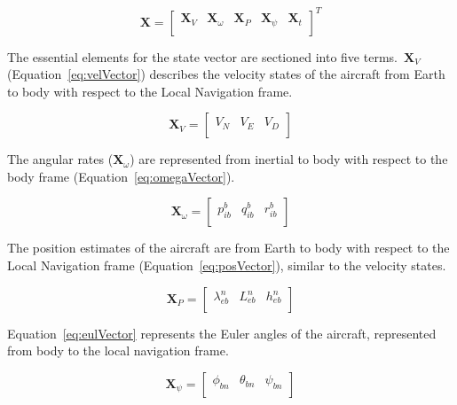 \begin{equation}\label{eq:stateVector}
    \mathbf{X} =
    \begin{bmatrix}
        \mathbf{X}_V & \mathbf{X}_{\omega} & \mathbf{X}_P & \mathbf{X}_{\psi} & \mathbf{X}_t \\
    \end{bmatrix}^T
\end{equation}

The essential elements for the state vector are sectioned into five terms.~\(\mathbf{X}_V\) (Equation~\ref{eq:velVector}) describes the velocity states of the aircraft from Earth to body with respect to the Local Navigation frame.

\begin{equation}\label{eq:velVector}
    \mathbf{X}_V =
    \begin{bmatrix}
        V_N & V_E & V_D \\
    \end{bmatrix}
\end{equation}

The angular rates (\(\mathbf{X}_{\omega}\)) are represented from inertial to body with respect to the body frame (Equation~\ref{eq:omegaVector}).

\begin{equation}\label{eq:omegaVector}
    \mathbf{X}_{\omega} =
    \begin{bmatrix}
        p_{ib}^b & q_{ib}^b & r_{ib}^b \\
    \end{bmatrix}
\end{equation}

The position estimates of the aircraft are from Earth to body with respect to the Local Navigation frame (Equation~\ref{eq:posVector}), similar to the velocity states.

\begin{equation}\label{eq:posVector}
    \mathbf{X}_P =
    \begin{bmatrix}
        \lambda_{eb}^n & L_{eb}^n & h_{eb}^n \\
    \end{bmatrix}
\end{equation}

Equation~\ref{eq:eulVector} represents the Euler angles of the aircraft, represented from body to the local navigation frame.

\begin{equation}\label{eq:eulVector}
    \mathbf{X}_{\psi} =
    \begin{bmatrix}
        \phi_{bn} & \theta_{bn} & \psi_{bn} \\
    \end{bmatrix}
\end{equation}

